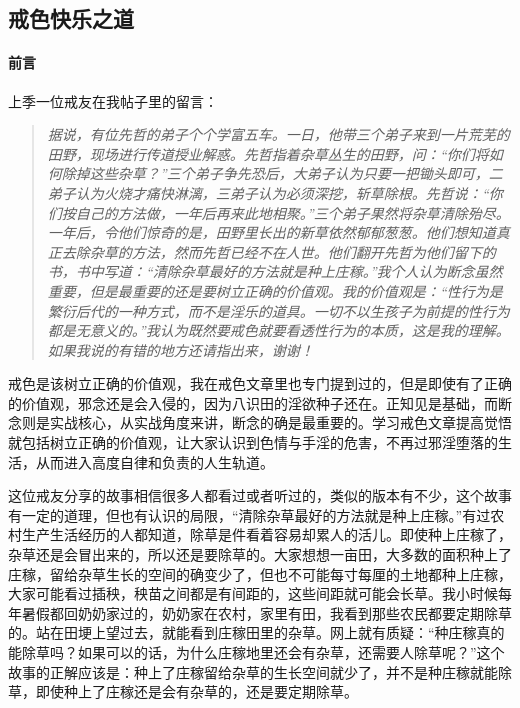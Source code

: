 \subsection{戒色快乐之道}

\paragraph*{前言}

上季一位戒友在我帖子里的留言：

\begin{quote}\it
    据说，有位先哲的弟子个个学富五车。一日，他带三个弟子来到一片荒芜的田野，现场进行传道授业解惑。先哲指着杂草丛生的田野，问：“你们将如何除掉这些杂草？”三个弟子争先恐后，大弟子认为只要一把锄头即可，二弟子认为火烧才痛快淋漓，三弟子认为必须深挖，斩草除根。先哲说：“你们按自己的方法做，一年后再来此地相聚。”三个弟子果然将杂草清除殆尽。一年后，令他们惊奇的是，田野里长出的新草依然郁郁葱葱。他们想知道真正去除杂草的方法，然而先哲已经不在人世。他们翻开先哲为他们留下的书，书中写道：“清除杂草最好的方法就是种上庄稼。”我个人认为断念虽然重要，但是最重要的还是要树立正确的价值观。我的价值观是：“性行为是繁衍后代的一种方式，而不是淫乐的道具。一切不以生孩子为前提的性行为都是无意义的。”我认为既然要戒色就要看透性行为的本质，这是我的理解。如果我说的有错的地方还请指出来，谢谢！
\end{quote}

戒色是该树立正确的价值观，我在戒色文章里也专门提到过的，但是即使有了正确的价值观，邪念还是会入侵的，因为八识田的淫欲种子还在。正知见是基础，而断念则是实战核心，从实战角度来讲，断念的确是最重要的。学习戒色文章提高觉悟就包括树立正确的价值观，让大家认识到色情与手淫的危害，不再过邪淫堕落的生活，从而进入高度自律和负责的人生轨道。

这位戒友分享的故事相信很多人都看过或者听过的，类似的版本有不少，这个故事有一定的道理，但也有认识的局限，“清除杂草最好的方法就是种上庄稼。”有过农村生产生活经历的人都知道，除草是件看着容易却累人的活儿。即使种上庄稼了，杂草还是会冒出来的，所以还是要除草的。大家想想一亩田，大多数的面积种上了庄稼，留给杂草生长的空间的确变少了，但也不可能每寸每厘的土地都种上庄稼，大家可能看过插秧，秧苗之间都是有间距的，这些间距就可能会长草。我小时候每年暑假都回奶奶家过的，奶奶家在农村，家里有田，我看到那些农民都要定期除草的。站在田埂上望过去，就能看到庄稼田里的杂草。网上就有质疑：“种庄稼真的能除草吗？如果可以的话，为什么庄稼地里还会有杂草，还需要人除草呢？”这个故事的正解应该是：种上了庄稼留给杂草的生长空间就少了，并不是种庄稼就能除草，即使种上了庄稼还是会有杂草的，还是要定期除草。

